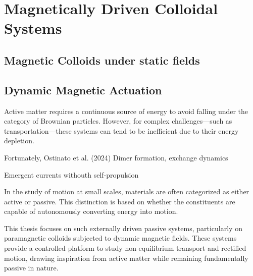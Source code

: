 \chapter{Magnetically Driven Colloidal Systems}
\label{magneticallydrivencolloidalsystems}

\section{Magnetic Colloids under static fields}

\section{Dynamic Magnetic Actuation}

Active matter requires a continuous source of energy to avoid falling under the category of Brownian particles. However, for complex challenges—such as transportation—these systems can tend to be inefficient due to their energy depletion.

Fortunately, Ostinato et al. (2024)
Dimer formation, exchange dynamics

Emergent currents withouth self-propulsion

In the study of motion at small scales, materials are often categorized as either active or passive. This distinction is based on whether the constituents are capable of autonomously converting energy into motion.


This thesis focuses on such externally driven passive systems, particularly on paramagnetic colloids subjected to dynamic magnetic fields. These systems provide a controlled platform to study non-equilibrium transport and rectified motion, drawing inspiration from active matter while remaining fundamentally passive in nature.

\newpage
